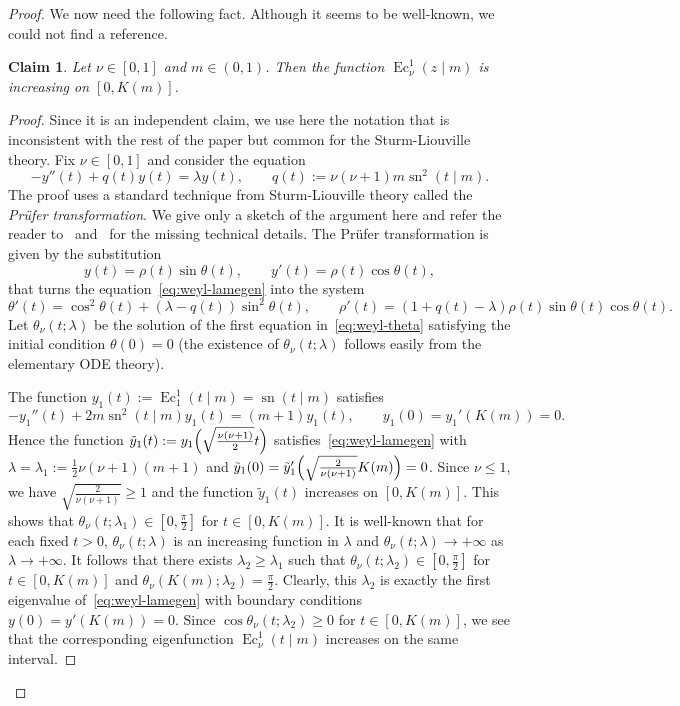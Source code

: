 \documentclass{amsart}
\let\le\leqslant
\let\ge\geqslant
\DeclareMathOperator{\Ec}{Ec}
\DeclareMathOperator{\sn}{sn}
\theoremstyle{plain}
\newtheorem{claim}{Claim}[section]
\theoremstyle{definition}
\theoremstyle{remark}
\begin{document}
\begin{proof}
We now need the following fact. Although it seems to be well-known, we could not
find a reference.

\begin{claim}
Let \(\nu\in [0,1]\) and \(m\in (0,1)\). Then the function \(\Ec_\nu^1(z\mid
m)\) is increasing on \([0,K(m)]\).
\end{claim}

\begin{proof}
Since it is an independent claim, we use here the notation that is inconsistent
with the rest of the paper but common for the Sturm-Liouville theory. Fix
\(\nu\in [0,1]\) and consider the equation
\begin{equation}\label{eq:weyl-lamegen} -y''(t)+q(t)y(t)=\lambda y(t),\qquad
q(t):=\nu(\nu+1)m\sn^2(t\mid m). \end{equation} The proof uses a standard
technique from Sturm-Liouville theory called the \emph{Pr\"ufer transformation}.
We give only a sketch of the argument here and refer the reader
to~\cite[Chapter~8]{CL1955} and~\cite[Chapter~4, sec.~5]{Zet2005} for the
missing technical details. The Pr\"ufer transformation is given by the
substitution
\[
y(t)=\rho(t)\sin\theta(t),\qquad y'(t)=\rho(t)\cos\theta(t),
\]
that turns the equation~\eqref{eq:weyl-lamegen} into the system
\begin{equation}\label{eq:weyl-theta}
\theta'(t)=\cos^2\theta(t)+(\lambda-q(t))\sin^2\theta(t),\qquad
\rho'(t)=(1+q(t)-\lambda)\rho(t)\sin\theta(t)\cos\theta(t).
\end{equation}
Let \(\theta_\nu(t;\lambda)\) be the solution of the first equation
in~\eqref{eq:weyl-theta} satisfying the initial condition \(\theta(0)=0\) (the
existence of \(\theta_\nu(t;\lambda)\) follows easily from the elementary ODE
theory).

The function \(y_1(t):=\Ec_1^1(t\mid m)=\sn(t\mid m)\) satisfies
\[
-y_1''(t)+2m\sn^2(t\mid m)y_1(t)=(m+1)y_1(t),\qquad
y_1(0)=y_1'(K(m))=0.
\]
Hence the function \(\tilde y_1(t):=y_1\Bigl(\sqrt{\frac{\nu(\nu+1)}2}t\Bigr)\)
satisfies~\eqref{eq:weyl-lamegen} with
\(\lambda=\lambda_1:=\frac{1}2\nu(\nu+1)(m+1)\) and \(\tilde y_1(0)=\tilde
y_1'\Bigl(\sqrt{\frac{2}{\nu(\nu+1)}}K(m)\Bigr)=0\). Since \(\nu\le 1\), we have
\(\sqrt{\frac{2}{\nu(\nu+1)}}\ge 1\) and the function \(\tilde y_1(t)\)
increases on \([0,K(m)]\). This shows that
\(\theta_\nu(t;\lambda_1)\in\left[0,\frac{\pi}2\right]\) for \(t\in [0,K(m)]\).
It is well-known that for each fixed \(t>0\), \(\theta_\nu(t;\lambda)\) is an
increasing function in \(\lambda\) and \(\theta_\nu(t;\lambda)\to +\infty\) as
\(\lambda\to +\infty\). It follows that there exists \(\lambda_2\ge\lambda_1\)
such that \(\theta_\nu(t;\lambda_2)\in\left[0,\frac{\pi}2\right]\) for \(t\in
[0,K(m)]\) and \(\theta_\nu(K(m);\lambda_2)=\frac{\pi}2\). Clearly, this
\(\lambda_2\) is exactly the first eigenvalue of~\eqref{eq:weyl-lamegen} with
boundary conditions \(y(0)=y'(K(m))=0\). Since \(\cos\theta_\nu(t;\lambda_2)\ge
0\) for \(t\in [0,K(m)]\), we see that the corresponding eigenfunction
\(\Ec_\nu^1(t\mid m)\) increases on the same interval.
\end{proof}


\end{proof}
\end{document}
